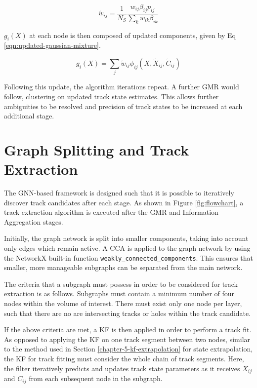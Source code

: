 \begin{equation}
\widetilde{w}_{ij} = \frac{1}{N_S} \frac{w_{ij}\beta_{ij} p_{ij}}{\sum_{k}w_{ik}\beta_{ik}}
\label{eqn:weights}
\end{equation}

$g_i(X)$ at each node is then composed of updated components, given by Eq \eqref{eqn:updated-gaussian-mixture}.

\begin{equation}
g_i(X) = \sum_{j} \widetilde{w}_{ij}\phi_{ij}(X, \widetilde{X}_{ij}, \widetilde{C}_{ij})
\label{eqn:updated-gaussian-mixture}
\end{equation}

Following this update, the algorithm iterations repeat. A further GMR would follow, clustering on updated track state estimates. This allows further ambiguities to be resolved and precision of track states to be increased at each additional stage.






\section{Graph Splitting and Track Extraction}
\label{gnn-track-extration}

The GNN-based framework is designed such that it is possible to iteratively discover track candidates after each stage. As shown in Figure \ref{fig:flowchart}, a track extraction algorithm is executed after the GMR and Information Aggregation stages.

Initially, the graph network is split into smaller components, taking into account only edges which remain active. A CCA is applied to the graph network by using the NetworkX built-in function \texttt{weakly\_connected\_components}. This ensures that smaller, more manageable subgraphs can be separated from the main network.

The criteria that a subgraph must possess in order to be considered for track extraction is as follows. Subgraphs must contain a minimum number of four nodes within the volume of interest. There must exist only one node per layer, such that there are no are intersecting tracks or holes within the track candidate. 

If the above criteria are met, a KF is then applied in order to perform a track fit. As opposed to applying the KF on one track segment between two nodes, similar to the method used in Section \ref{chapter-5-kf-extrapolation} for state extrapolation, the KF for track fitting must consider the whole chain of track segments. Here, the filter iteratively predicts and updates track state parameters as it receives $X_{ij}$ and $C_{ij}$ from each subsequent node in the subgraph.

